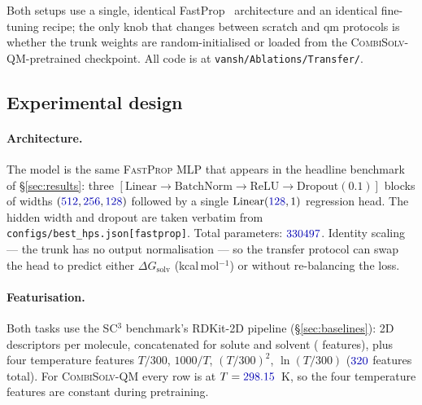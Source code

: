 Both setups use a single, identical FastProp~\citep{burns2024fastprop}
architecture and an identical fine-tuning recipe; the only knob that
changes between scratch and qm protocols is whether the trunk weights
are random-initialised or loaded from the
\textsc{CombiSolv-QM}-pretrained checkpoint.  All code is at
\texttt{vansh/Ablations/Transfer/}.

\subsection{Experimental design}
\label{sec:transfer_setup}

\paragraph{Architecture.}  The model is the same \textsc{FastProp} MLP
that appears in the headline benchmark of §\ref{sec:results}: three
$[\text{Linear} \to \text{BatchNorm} \to \text{ReLU} \to
\text{Dropout}(0.1)]$ blocks of widths $(\numval{512}, \numval{256},
\numval{128})$ followed by a single $\text{Linear}(\numval{128}, 1)$
regression head.  The hidden width and dropout are taken verbatim
from \texttt{configs/best\_hps.json[\textsf{fastprop}]}.  Total
parameters: $\numval{330497}$.  Identity scaling --- the trunk has no
output normalisation --- so the transfer protocol can swap the head
to predict either $\Delta G_{\text{solv}}$ (kcal\,mol$^{-1}$) or
\logS{} without re-balancing the loss.

\paragraph{Featurisation.}  Both tasks use the SC$^3$ benchmark's
RDKit-2D pipeline (§\ref{sec:baselines}):  2D descriptors
per molecule, concatenated for solute and solvent (
features), plus four temperature features $T/300$, $1000/T$,
$(T/300)^2$, $\ln(T/300)$ ($\numval{320}$ features total).  For
\textsc{CombiSolv-QM} every row is at $T = \numval{298.15}$~K, so the
four temperature features are constant during pretraining.

